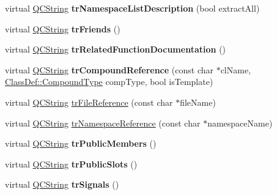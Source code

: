 \begin{DoxyCompactItemize}
\item 
\hypertarget{class_translator_chinese_aeb5226ccdd672b54940c1705029367da}{virtual \hyperlink{class_q_c_string}{Q\-C\-String} {\bfseries tr\-Namespace\-List\-Description} (bool extract\-All)}\label{class_translator_chinese_aeb5226ccdd672b54940c1705029367da}

\item 
\hypertarget{class_translator_chinese_a77493be94d937cfe7458c6317d792eb6}{virtual \hyperlink{class_q_c_string}{Q\-C\-String} {\bfseries tr\-Friends} ()}\label{class_translator_chinese_a77493be94d937cfe7458c6317d792eb6}

\item 
\hypertarget{class_translator_chinese_a5b5913d0d888aaca721ef5a67333bad1}{virtual \hyperlink{class_q_c_string}{Q\-C\-String} {\bfseries tr\-Related\-Function\-Documentation} ()}\label{class_translator_chinese_a5b5913d0d888aaca721ef5a67333bad1}

\item 
\hypertarget{class_translator_chinese_ae4c559d830de6436ef53c6ebcc3b1849}{virtual \hyperlink{class_q_c_string}{Q\-C\-String} {\bfseries tr\-Compound\-Reference} (const char $\ast$cl\-Name, \hyperlink{class_class_def_a768a6f0a6fd7e9087ff7971abbcc3f36}{Class\-Def\-::\-Compound\-Type} comp\-Type, bool is\-Template)}\label{class_translator_chinese_ae4c559d830de6436ef53c6ebcc3b1849}

\item 
virtual \hyperlink{class_q_c_string}{Q\-C\-String} \hyperlink{class_translator_chinese_ab97b8df22dd810e2260a8cb9b06febbb}{tr\-File\-Reference} (const char $\ast$file\-Name)
\item 
virtual \hyperlink{class_q_c_string}{Q\-C\-String} \hyperlink{class_translator_chinese_a6014867d291ed13bd505e90304b3f7ba}{tr\-Namespace\-Reference} (const char $\ast$namespace\-Name)
\item 
\hypertarget{class_translator_chinese_aa766ee4ea863124dbd2c2cbfe8f615f6}{virtual \hyperlink{class_q_c_string}{Q\-C\-String} {\bfseries tr\-Public\-Members} ()}\label{class_translator_chinese_aa766ee4ea863124dbd2c2cbfe8f615f6}

\item 
\hypertarget{class_translator_chinese_a00352dfc34ae1206bd8572a9c477b8df}{virtual \hyperlink{class_q_c_string}{Q\-C\-String} {\bfseries tr\-Public\-Slots} ()}\label{class_translator_chinese_a00352dfc34ae1206bd8572a9c477b8df}

\item 
\hypertarget{class_translator_chinese_a33921a62881c1973ef5bd381a6e982a4}{virtual \hyperlink{class_q_c_string}{Q\-C\-String} {\bfseries tr\-Signals} ()}\label{class_translator_chinese_a33921a62881c1973ef5bd381a6e982a4}


\end{DoxyCompactItemize}
